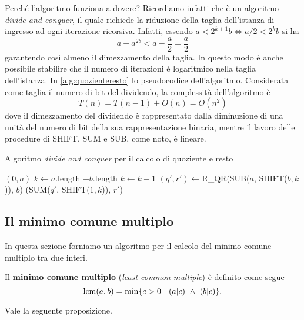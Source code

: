 Perché l'algoritmo funziona a dovere? Ricordiamo infatti che è un algoritmo \textit{divide and conquer}, il quale richiede la riduzione della taglia dell'istanza di ingresso ad ogni iterazione ricorsiva. Infatti, essendo $a<2^{k+1}b \Leftrightarrow a/2<2^kb$ si ha
\[
a-a^{2b} < a-\frac{a}{2}=\frac{a}{2}
\]
garantendo così almeno il dimezzamento della taglia. In questo modo è anche possibile stabilire che il numero di iterazioni è logaritmico nella taglia dell'istanza. In \ref{alg:quozienteresto} lo pseudocodice dell'algoritmo. Considerata come taglia il numero di bit del dividendo, la complessità dell'algoritmo è
\[
T(n)=T(n-1)+O(n)=O(n^2)
\]
dove il dimezzamento del dividendo è rappresentato dalla diminuzione di una unità del numero di bit della sua rappresentazione binaria, mentre il lavoro delle procedure di SHIFT, SUM e SUB, come noto, è lineare.

\begin{algorithm}
\caption{Algoritmo \textit{divide and conquer} per il calcolo di quoziente e resto}
\label{alg:quozienteresto}
\begin{algorithmic}
		\State \Return $(0,a)$
	\EndIf
	\State $k \gets a$.length $- b.$length
		\State $k\gets k-1$
		\State $(q',r')\gets$R\_QR(SUB($a$, SHIFT($b,k$)), $b$)
	\EndIf
	\State \Return (SUM($q'$, SHIFT($1,k$)), $r'$)
\EndFunction
\end{algorithmic}
\end{algorithm}

\subsection{Il minimo comune multiplo}
In questa sezione forniamo un algoritmo per il calcolo del minimo comune multiplo tra due interi.

\begin{definizione}
Il \textbf{minimo comune multiplo} (\textit{least common multiple}) è definito come segue
\[
\lcm(a,b)=\min\{c>0\ |\ (a|c)\ \land\ (b|c)\}.
\]
\end{definizione}

Vale la seguente proposizione.

